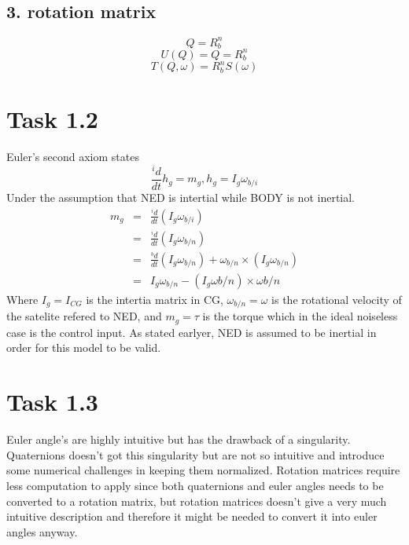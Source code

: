 \documentclass[11pt]{article}
\begin{document}
\subsection*{3. rotation matrix}
\begin{equation}
 Q = R_b^n
\end{equation}
\begin{equation}
 U(Q) = Q = R_b^n
\end{equation}
\begin{equation}
 T(Q,\omega) = R_b^nS(\omega)
\end{equation}

\section*{Task 1.2}
Euler's second axiom states
\[ \frac{^i d}{dt} h_g = m_g, h_g = I_g \omega_{b/i} \]
Under the assumption that NED is intertial while BODY is not inertial.
\begin{eqnarray*}
m_g &=& \frac{^i d}{dt}(I_g \omega_{b/i}) \\
&=& \frac{^i d}{dt}(I_g \omega_{b/n}) \\
&=& \frac{^b d}{dt}(I_g \omega_{b/n}) + \omega_{b/n} \times (I_g \omega_{b/n}) \\
&=& I_g \omega_{b/n} - (I_g \omega{b/n}) \times \omega{b/n}
\end{eqnarray*}
Where $I_g = I_{CG}$ is the intertia matrix in CG, $\omega_{b/n} = \omega$ is the rotational velocity of the satelite refered to NED, and $m_g = \tau$ is the torque which in the ideal noiseless case is the control input. As stated earlyer, NED is assumed to be inertial in order for this model to be valid.

\section*{Task 1.3}
Euler angle's are highly intuitive but has the drawback of a singularity. Quaternions doesn't got this singularity but are not so intuitive and introduce some numerical challenges in keeping them normalized. Rotation matrices require less computation to apply since both quaternions and euler angles needs to be converted to a rotation matrix, but rotation matrices doesn't give a very much intuitive description and therefore it might be needed to convert it into euler angles anyway.
\end{document}
